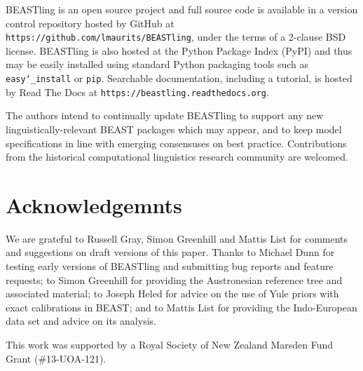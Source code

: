 \documentclass[10pt,a4paper]{article}
\begin{document}
BEASTling is an open source project and full source code is available in a version control repository hosted by GitHub at \texttt{https://github.com/lmaurits/BEASTling}, under the terms of a 2-clause BSD license.  BEASTling is also hosted at the Python Package Index (PyPI) and thus may be easily installed using standard Python packaging tools such as \texttt{easy\char`_install} or \texttt{pip}.  Searchable documentation, including a tutorial, is hosted by Read The Docs at \texttt{https://beastling.readthedocs.org}.

The authors intend to continually update BEASTling to support any new linguistically-relevant BEAST packages which may appear, and to keep model specifications in line with emerging consensuses on best practice.  Contributions from the historical computational linguistics research community are welcomed.

\section{Acknowledgemnts}

We are grateful to Russell Gray, Simon Greenhill and Mattis List for comments and suggestions on draft versions of this paper.  Thanks to Michael Dunn for testing early versions of BEASTling and submitting bug reports and feature requests; to Simon Greenhill for providing the Austronesian reference tree and associated material; to Joseph Heled for advice on the use of Yule priors with exact calibrations in BEAST; and to Mattis List for providing the Indo-European data set and advice on its analysis.

This work was supported by a Royal Society of New Zealand Marsden Fund Grant (\#13-UOA-121).



\end{document}
